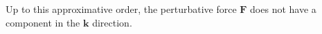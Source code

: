 Up to this approximative order, the perturbative force $\mathbf{F}$ does not have a component in the $\mathbf{k}$ direction. 

	
	





 




